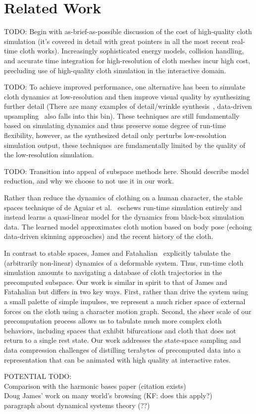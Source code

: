 \section{Related Work}

TODO: Begin with as-brief-as-possible discussion of the cost of high-quality cloth simulation (it's covered in detail with great pointers in all the most recent real-time cloth works).  Increasingly sophisticated energy models, collision handling, and accurate time integration for high-resolution of cloth meshes incur high cost, precluding use of high-quality cloth simulation in the interactive domain.

TODO: To achieve improved performance, one alternative has been to simulate cloth dynamics at low-resolution and then improve visual quality by synthesizing further detail (There are many examples of detail/wrinkle synthesis~\cite{Wang:2010}, data-driven upsampling~\cite{Kavan:2011} also falls into this bin).  These techniques are still fundamentally based on simulating dynamics and thus preserve some degree of run-time flexibility, however, as the synthesized detail only perturbs low-resolution simulation output, these techniques are fundamentally limited by the quality of the low-resolution simulation.

TODO: Transition into appeal of subspace methods here. Should describe model reduction, and why we choose to not use it in our work.

Rather than reduce the dynamics of clothing on a human character, the stable spaces technique of de Aguiar et al.~ eschews run-time simulation entirely and instead learns a quasi-linear model for the dynamics from black-box simulation data. The learned model approximates cloth motion based on body pose (echoing data-driven skinning approaches) and the recent history of the cloth.

In contrast to stable spaces, James and Fatahalian~ explicitly tabulate the (arbitrarily non-linear) dynamics of a deformable system.  Thus, run-time cloth simulation amounts to navigating a database of cloth trajectories in the precomputed subspace.  Our work is similar in spirit to that of James and Fatahalian but differs in two key ways.  First, rather than drive the system using a small palette of simple impulses, we represent a much richer space of external forces on the cloth using a character motion graph.  Second, the sheer scale of our precomputation process allows us to tabulate much more complex cloth behaviors, including spaces that exhibit bifurcations and cloth that does not return to a single rest state. Our work addresses the state-space sampling and data compression challenges of distilling terabytes of precomputed data into a representation that can be animated with high quality at interactive rates.


POTENTIAL TODO:\\
Comparison with the harmonic bases paper (citation exists) \\
Doug James' work on many world's browsing (KF: does this apply?)\\
paragraph about dynamical systems theory (??) \\
